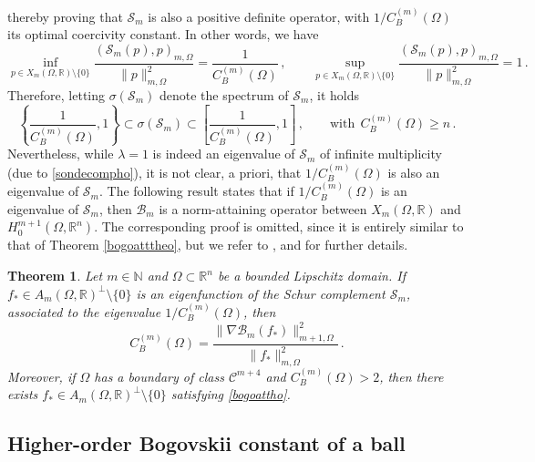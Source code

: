 \documentclass[11pt]{article}
\newtheorem{theorem}{Theorem}[section]
\theoremstyle{plain}
\theoremstyle{definition}
\numberwithin{equation}{section}
\newcommand{\R}{\mathbb{R}}
\begin{document}
thereby proving that $\mathcal{S}_{m}$ is also a positive definite  operator, with $1/C^{(m)}_{B}(\Omega)$  its optimal coercivity constant. In other words, we have
$$
\inf_{p \in X_{m}(\Omega, \mathbb{R}) \setminus \{0\}} \dfrac{(\mathcal{S}_{m}(p),p)_{m, \Omega}}{\|p\|_{m,\Omega}^2} = \dfrac{1}{C^{(m)}_{B}(\Omega)} \, , \qquad \sup_{p \in X_{m}(\Omega, \mathbb{R}) \setminus \{0\}} \dfrac{(\mathcal{S}_{m}(p),p)_{m, \Omega}}{\|p\|_{m,\Omega}^2} = 1 \, .
$$
Therefore, letting $\sigma(\mathcal{S}_{m})$ denote the spectrum of $\mathcal{S}_{m}$, it holds
\begin{equation} \label{spectrum1ho}
	\left\{ \dfrac{1}{C^{(m)}_{B}(\Omega)},1 \right\} \subset \sigma(\mathcal{S}_{m}) \subset \left[ \dfrac{1}{C_{B}^{(m)}(\Omega)},1 \right] \, , \qquad \text{with} \  \ C_{B}^{(m)}(\Omega) \geq n \, .
\end{equation}
Nevertheless, while $\lambda =1$ is indeed an eigenvalue of $\mathcal{S}_{m}$ of infinite multiplicity (due to \eqref{sondecompho}), it is not clear, a priori, that $1/C_{B}^{(m)}(\Omega)$ is also an eigenvalue of $\mathcal{S}_{m}$. The following result states that if $1/C_{B}^{(m)}(\Omega)$ is an eigenvalue of $\mathcal{S}_{m}$, then $\mathcal{B}_{m}$ is a norm-attaining operator between $X_{m}(\Omega, \mathbb{R})$ and $H_{0}^{m+1}(\Omega, \mathbb{R}^{n})$. The corresponding proof is omitted, since it is entirely similar to that of Theorem \ref{bogoatttheo}, but we refer to \cite[Chapter I, Section 6]{riedl2010cosserat}, \cite[Section 2]{riedl2013cosserat} and \cite[Section 11]{weyers2006q} for further details.

\begin{theorem}\label{bogoatttheoho}
	Let $m \in \mathbb{N}$ and $\Omega\subset\R^n$ be a bounded Lipschitz domain. If $f_{*} \in A_{m}(\Omega, \mathbb{R})^{\perp} \setminus \{0\}$ is an eigenfunction of the Schur complement $\mathcal{S}_{m}$, associated to the eigenvalue $1/C^{(m)}_{B}(\Omega)$, then
	\begin{equation}\label{bogoattho}
		C^{(m)}_{B}(\Omega) = \dfrac{\| \nabla \mathcal{B}_{m}(f_{*}) \|_{m+1, \Omega}^2}{\| f_{*} \|_{m, \Omega}^2} \, .
	\end{equation}
Moreover, if $\Omega$ has a boundary of class $\mathcal{C}^{m+4}$ and $C^{(m)}_{B}(\Omega) > 2$, then there exists $f_{*} \in A_{m}(\Omega, \mathbb{R})^{\perp} \setminus \{0\}$ satisfying \eqref{bogoattho}.
\end{theorem}

\subsection{Higher-order Bogovskii constant of a ball}
\end{document}
